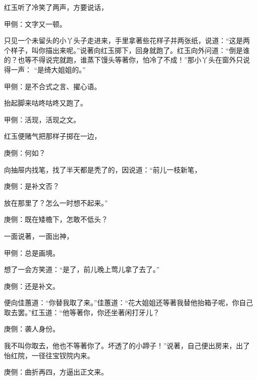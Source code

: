 \begin{parag}
    红玉听了冷笑了两声，方要说话，\begin{note}甲侧：文字又一顿。\end{note}只见一个未留头的小丫头子走进来，手里拿著些花样子并两张纸，说道：“这是两个样子，叫你描出来呢。”说著向红玉掷下，回身就跑了。红玉向外问道：“倒是谁的？也等不得说完就跑，谁蒸下馒头等著你，怕冷了不成！”那小丫头在窗外只说得一声： “是绮大姐姐的。”\begin{note}甲侧：是不合式之言、擢心语。\end{note}抬起脚来咕咚咕咚又跑了。\begin{note}甲侧：活现，活现之文。\end{note}红玉便赌气把那样子掷在一边，\begin{note}庚侧：何如？\end{note}向抽屉内找笔，找了半天都是秃了的，因说道：“前儿一枝新笔，\begin{note}庚侧：是补文否？\end{note}放在那里了？怎么一时想不起来。”\begin{note}庚侧：既在矮檐下，怎敢不低头？\end{note}一面说著，一面出神，\begin{note}甲侧：总是画境。\end{note}想了一会方笑道：“是了，前儿晚上莺儿拿了去了。”\begin{note}庚侧：还是补文。\end{note}便向佳蕙道：“你替我取了来。”佳蕙道：“花大姐姐还等著我替他抬箱子呢，你自己取去罢。”红玉道：“他等著你，你还坐著闲打牙儿？\begin{note}庚侧：袭人身份。\end{note}我不叫你取去，他也不等著你了。坏透了的小蹄子！”说著，自己便出房来，出了怡红院，一径往宝钗院内来。\begin{note}庚侧：曲折再四，方逼出正文来。\end{note}
\end{parag}


